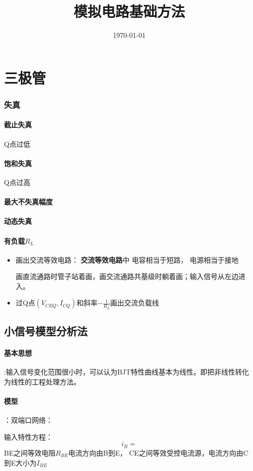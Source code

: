 \documentclass[UTF8]{ctexart}
\title{模拟电路基础}
\date{\today}
\begin{document}
	\section{三极管}
		\subsubsection{失真}
			\paragraph{截止失真}
				Q点过低
			\paragraph{饱和失真}
				Q点过高
			\paragraph{最大不失真幅度}
		\paragraph{动态失真}
			\paragraph{有负载$R_L$}
			\begin{itemize}\title{方法}
				\item 画出交流等效电路：
					\textbf{交流等效电路}中
						电容相当于短路， 电源相当于接地\par
					画直流通路时管子站着画，画交流通路共基级时躺着画；输入信号从左边进入。
				\item 过Q点$(V_{CEQ},I_{CQ})$和斜率$-\frac{1}{R_L}$画出交流负载线
			\end{itemize}
		\subsection{小信号模型分析法}
			\paragraph{基本思想}:输入信号变化范围很小时，可以认为BJT特性曲线基本为线性。即把非线性转化为线性的工程处理方法。
			\paragraph{模型}：双端口网络：\par
			输入特性方程：
			\[i_B=\]
			BE之间等效电阻$R_{BE}$电流方向由B到E， CE之间等效受控电流源，电流方向由C到E大小为$I_{BE}$
			
			
\end{document}
